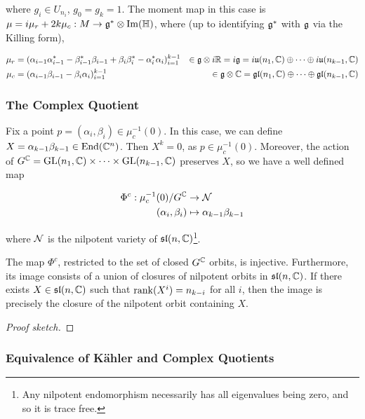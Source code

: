 \documentclass{article}
\renewcommand{\sl}{\mfs\mfl}
\begin{document}
where \(g_i \in U_{n_i}\), \(g_0 = g_k = 1\). The moment map in this case is \(\mu = i\mu_r + 2k\mu_c : M \to \mathfrak{g}^* \otimes \Im(\mathbb{H})\), where (up to identifying \(\mathfrak{g}^*\) with \(\mathfrak{g}\) via the Killing form),

\begin{align*}
    \mu_r &= (\alpha_{i-1}\alpha_{i-1}^* - \beta_{i-1}^*\beta_{i-1} + \beta_i\beta_i^* - \alpha_i^*\alpha_i)_{i=1}^{k-1} &\in \mathfrak{g} \otimes i\mathbb{R} = i\mathfrak{g} = i\mathfrak{u}(n_1, \mathbb{C}) \oplus \cdots \oplus i\mathfrak{u}(n_{k-1}, \mathbb{C}) \\
    \mu_c &= (\alpha_{i-1}\beta_{i-1} - \beta_i\alpha_i)_{i=1}^{k-1} &\in \mathfrak{g} \otimes \mathbb{C} = \mathfrak{g}\mathfrak{l}(n_1, \mathbb{C}) \oplus \cdots \oplus \mathfrak{g}\mathfrak{l}(n_{k-1}, \mathbb{C})
\end{align*}

\subsubsection{The Complex Quotient}

Fix a point \(p = (\alpha_i, \beta_i) \in \mu_c^{-1}(0)\). In this case, we can define \(X = \alpha_{k-1}\beta_{k-1} \in \operatorname{End}(\mathbb{C}^n)\). Then \(X^k = 0\), as \(p \in \mu_c^{-1}(0)\). Moreover, the action of \(G^{\mathbb{C}} = \operatorname{GL}(n_1, \mathbb{C}) \times \cdots \times \operatorname{GL}(n_{k-1}, \mathbb{C})\) preserves \(X\), so we have a well defined map

\begin{align*}
    \Phi^c : \mu_c^{-1}(0) / G^{\mathbb{C}} &\to \mathcal{N} \\
    (\alpha_i, \beta_i) &\mapsto \alpha_{k-1}\beta_{k-1}
\end{align*}

where \(\mathcal{N}\) is the nilpotent variety of \(\sl(n, \C)\)\footnote{Any nilpotent endomorphism necessarily has all eigenvalues being zero, and so it is trace free.}.

\begin{theorem}
    \label{thm:cx-quot-sln}
    The map \(\Phi^c\), restricted to the set of closed \(G^{\mathbb{C}}\) orbits, is injective. Furthermore, its image consists of a union of closures of nilpotent orbits in \(\sl(n, \C)\). If there exists \(X \in \sl(n, \C)\) such that \(\rank(X^i) = n_{k-i}\) for all \(i\), then the image is precisely the closure of the nilpotent orbit containing \(X\).
\end{theorem}

\begin{proof}
    [Proof sketch]
\end{proof}

\subsubsection{Equivalence of K\"ahler and Complex Quotients}
\end{document}
